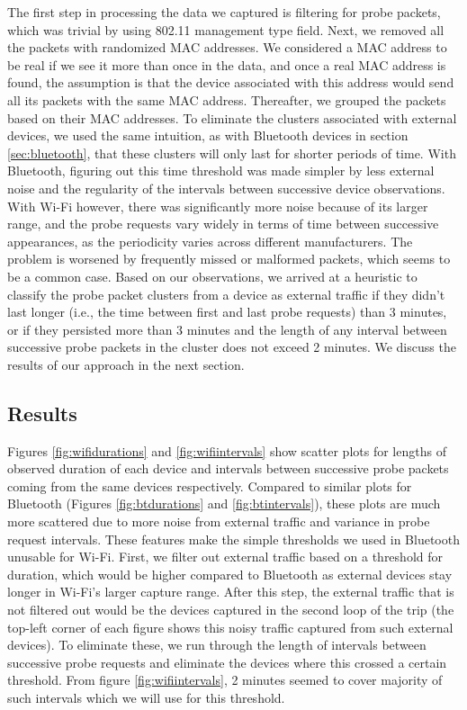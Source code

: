 The first step in processing the data we captured is filtering for probe packets, which was trivial by using 802.11 management type field. Next, we removed all the packets with randomized MAC addresses. We considered a MAC address to be real if we see it more than once in the data, and once a real MAC address is found, the assumption is that the device associated with this address would send all its packets with the same MAC address. Thereafter, we grouped the packets based on their MAC addresses. To eliminate the clusters associated with external devices, we used the same intuition, as with Bluetooth devices in section \ref{sec:bluetooth}, that these clusters will only last for shorter periods of time. With Bluetooth, figuring out this time threshold was made simpler by less external noise and the regularity of the intervals between successive device observations. With Wi-Fi however, there was significantly more noise because of its larger range, and the probe requests vary widely in terms of time between successive appearances, as the periodicity varies across different manufacturers. The problem is worsened by frequently missed or malformed packets, which seems to be a common case. Based on our observations, we arrived at a heuristic to classify the probe packet clusters from a device as external traffic if they didn't last longer (i.e., the time between first and last probe requests) than 3 minutes, or if they persisted more than 3 minutes and the length of any interval between successive probe packets in the cluster does not exceed 2 minutes. We discuss the results of our approach in the next section. \\

\subsection{Results}

Figures \ref{fig:wifidurations} and \ref{fig:wifiintervals} show scatter plots for lengths of observed duration of each device and intervals between successive probe packets coming from the same devices respectively. Compared to similar plots for Bluetooth (Figures \ref{fig:btdurations} and \ref{fig:btintervals}), these plots are much more scattered due to more noise from external traffic and variance in probe request intervals. These features make the simple thresholds we used in Bluetooth unusable for Wi-Fi. First, we filter out external traffic based on a threshold for duration, which would be higher compared to Bluetooth as external devices stay longer in Wi-Fi's larger capture range. After this step, the external traffic that is not filtered out would be the devices captured in the second loop of the trip (the top-left corner of each figure shows this noisy traffic captured from such external devices). To eliminate these, we run through the length of intervals between successive probe requests and eliminate the devices where this crossed a certain threshold. From figure \ref{fig:wifiintervals}, 2 minutes seemed to cover majority of such intervals which we will use for this threshold. \\

